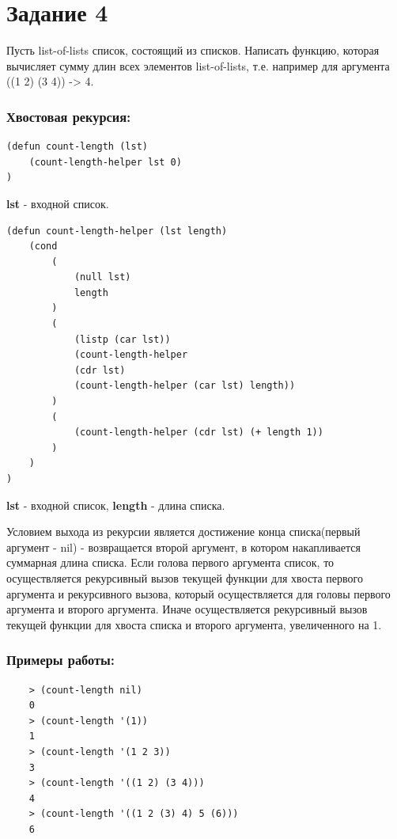 \documentclass[a4paper, 12pt]{article}
\begin{document}
\section*{Задание 4}
Пусть list-of-lists список, состоящий из списков. Написать функцию, которая вычисляет сумму длин всех элементов list-of-lists, т.е. например для аргумента ((1 2) (3 4)) -> 4.

\subsubsection*{Хвостовая рекурсия:}
\begin{lstlisting}[caption=Функция-обертка для вычисления суммарной длины списков]
(defun count-length (lst)
	(count-length-helper lst 0)
)
\end{lstlisting}
\textbf{lst} - входной список.
\begin{lstlisting}[caption=Функция для вычисления суммарной длины списков]
(defun count-length-helper (lst length)
	(cond	
		(
			(null lst) 
			length
		)
		(
			(listp (car lst)) 
			(count-length-helper 
			(cdr lst) 
			(count-length-helper (car lst) length)) 
		)
		(
			(count-length-helper (cdr lst) (+ length 1))
		)
	)
)
\end{lstlisting}
\textbf{lst} - входной список, \textbf{length} - длина списка.

Условием выхода из рекурсии является достижение конца списка(первый аргумент - nil) - возвращается второй аргумент, в котором накапливается суммарная длина списка. Если голова первого аргумента список, то осуществляется рекурсивный вызов текущей функции для хвоста первого аргумента и рекурсивного вызова, который осуществляется для головы первого аргумента и второго аргумента. Иначе осуществляется рекурсивный вызов текущей функции для хвоста списка и второго аргумента, увеличенного на 1.

\subsubsection*{Примеры работы:}
\begin{lstlisting}
	> (count-length nil)
	0
	> (count-length '(1))
	1
	> (count-length '(1 2 3))
	3
	> (count-length '((1 2) (3 4)))
	4
	> (count-length '((1 2 (3) 4) 5 (6)))
	6
\end{lstlisting}
\end{document}
